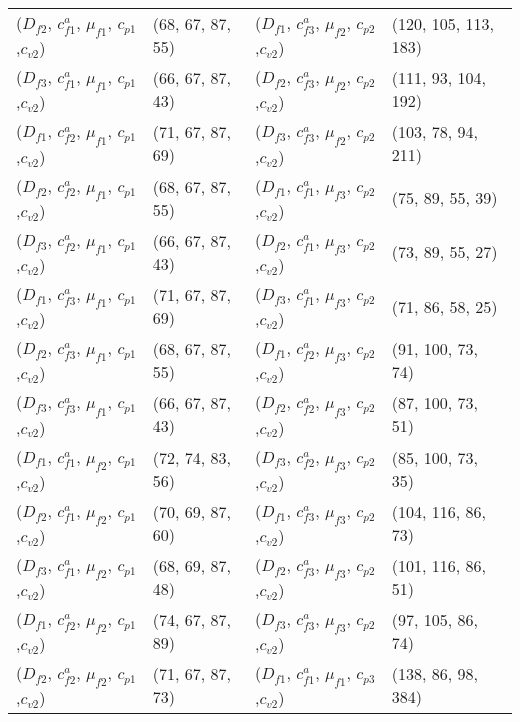 \documentclass[preprint,12pt]{elsarticle}
\begin{document}
\begin{appendices}
\begin{table}[htbp]
\begin{tabular}{llll}
    ($D_{f2}$, $c^{a}_{f1}$, $\mu_{f1}$, $c_{p1}$,$c_{v2}$) & (68, 67, 87, 55) & ($D_{f1}$, $c^{a}_{f3}$, $\mu_{f2}$, $c_{p2}$,$c_{v2}$) & (120, 105, 113, 183) \\
    ($D_{f3}$, $c^{a}_{f1}$, $\mu_{f1}$, $c_{p1}$,$c_{v2}$) & (66, 67, 87, 43) & ($D_{f2}$, $c^{a}_{f3}$, $\mu_{f2}$, $c_{p2}$,$c_{v2}$) & (111, 93, 104, 192) \\
    ($D_{f1}$, $c^{a}_{f2}$, $\mu_{f1}$, $c_{p1}$,$c_{v2}$) & (71, 67, 87, 69) & ($D_{f3}$, $c^{a}_{f3}$, $\mu_{f2}$, $c_{p2}$,$c_{v2}$) & (103, 78, 94, 211) \\
    ($D_{f2}$, $c^{a}_{f2}$, $\mu_{f1}$, $c_{p1}$,$c_{v2}$) & (68, 67, 87, 55) & ($D_{f1}$, $c^{a}_{f1}$, $\mu_{f3}$, $c_{p2}$,$c_{v2}$) & (75, 89, 55, 39) \\
    ($D_{f3}$, $c^{a}_{f2}$, $\mu_{f1}$, $c_{p1}$,$c_{v2}$) & (66, 67, 87, 43) & ($D_{f2}$, $c^{a}_{f1}$, $\mu_{f3}$, $c_{p2}$,$c_{v2}$) & (73, 89, 55, 27) \\
    ($D_{f1}$, $c^{a}_{f3}$, $\mu_{f1}$, $c_{p1}$,$c_{v2}$) & (71, 67, 87, 69) & ($D_{f3}$, $c^{a}_{f1}$, $\mu_{f3}$, $c_{p2}$,$c_{v2}$) & (71, 86, 58, 25) \\
    ($D_{f2}$, $c^{a}_{f3}$, $\mu_{f1}$, $c_{p1}$,$c_{v2}$) & (68, 67, 87, 55) & ($D_{f1}$, $c^{a}_{f2}$, $\mu_{f3}$, $c_{p2}$,$c_{v2}$) & (91, 100, 73, 74) \\
    ($D_{f3}$, $c^{a}_{f3}$, $\mu_{f1}$, $c_{p1}$,$c_{v2}$) & (66, 67, 87, 43) & ($D_{f2}$, $c^{a}_{f2}$, $\mu_{f3}$, $c_{p2}$,$c_{v2}$) & (87, 100, 73, 51) \\
    ($D_{f1}$, $c^{a}_{f1}$, $\mu_{f2}$, $c_{p1}$,$c_{v2}$) & (72, 74, 83, 56) & ($D_{f3}$, $c^{a}_{f2}$, $\mu_{f3}$, $c_{p2}$,$c_{v2}$) & (85, 100, 73, 35) \\
    ($D_{f2}$, $c^{a}_{f1}$, $\mu_{f2}$, $c_{p1}$,$c_{v2}$) & (70, 69, 87, 60) & ($D_{f1}$, $c^{a}_{f3}$, $\mu_{f3}$, $c_{p2}$,$c_{v2}$) & (104, 116, 86, 73) \\
    ($D_{f3}$, $c^{a}_{f1}$, $\mu_{f2}$, $c_{p1}$,$c_{v2}$) & (68, 69, 87, 48) & ($D_{f2}$, $c^{a}_{f3}$, $\mu_{f3}$, $c_{p2}$,$c_{v2}$) & (101, 116, 86, 51) \\
    ($D_{f1}$, $c^{a}_{f2}$, $\mu_{f2}$, $c_{p1}$,$c_{v2}$) & (74, 67, 87, 89) & ($D_{f3}$, $c^{a}_{f3}$, $\mu_{f3}$, $c_{p2}$,$c_{v2}$) & (97, 105, 86, 74) \\
    ($D_{f2}$, $c^{a}_{f2}$, $\mu_{f2}$, $c_{p1}$,$c_{v2}$) & (71, 67, 87, 73) & ($D_{f1}$, $c^{a}_{f1}$, $\mu_{f1}$, $c_{p3}$,$c_{v2}$) & (138, 86, 98, 384) \\

\end{tabular}
\end{table}
\end{appendices}
\end{document}
